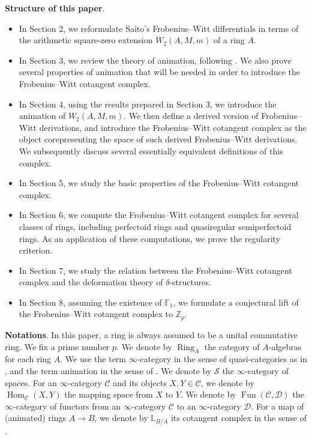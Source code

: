 \documentclass[11pt, a4paper]{amsart}
\theoremstyle{plain}
\theoremstyle{definition}
\begin{document}
\vspace{2mm}
\textbf{Structure of this paper}. 
\begin{itemize}
    \item In Section 2, we reformulate Saito’s Frobenius--Witt differentials in terms of the arithmetic square-zero extension $W_2(A,M,m)$ of a ring $A$.
    \item In Section 3, we review the theory of animation, following \cite{CS24}. We also prove several properties of animation that will be needed in order to introduce the Frobenius--Witt cotangent complex.
    \item In Section 4, using the results prepared in Section 3, we introduce the animation of $W_2(A,M,m)$. We then define a derived version of Frobenius--Witt derivations, and introduce the Frobenius--Witt cotangent complex as the object corepresenting the space of such derived Frobenius--Witt derivations. We subsequently discuss several essentially equivalent definitions of this complex.
    \item In Section 5, we study the basic properties of the Frobenius--Witt cotangent complex.
    \item In Section 6, we compute the Frobenius--Witt cotangent complex for several classes of rings, including perfectoid rings and quasiregular semiperfectoid rings. As an application of these computations, we prove the regularity criterion.
    \item In Section 7, we study the relation between the Frobenius--Witt cotangent complex and the deformation theory of $\delta$-structures.
    \item In Section 8, assuming the existence of $\mathbb F_1$, we formulate a conjectural lift of the Frobenius--Witt cotangent complex to $\mathbb Z_p$.
\end{itemize}















\vspace{2mm}
\textbf{Notations}. In this paper, a ring is always assumed to be a unital commutative ring. We fix a prime number $p$. We denote by $\operatorname{Ring}_A$ the category of $A$-algebras for each ring $A$. We use the term $\infty$-category in the sense of quasi-categories as in \cite{Lur09}, and the term animation in the sense of \cite[Section 5.1]{CS24}. We denote by $\mathcal S$ the $\infty$-category of spaces. For an $\infty$-category $\mathscr C$ and its objects $X, Y\in \mathscr C$, we denote by $\operatorname{Hom}_{\mathscr C}(X,Y)$ the mapping space from $X$ to $Y$. We denote by $\operatorname{Fun}(\mathscr C,\mathscr D)$ the $\infty$-category of functors from an $\infty$-category $\mathscr C$ to an $\infty$-category $\mathscr D$. For a map of (animated) rings $A\to B$, we denote by $\mathbb L_{B/A}$ its cotangent complex in the sense of \cite[Definition 2.33]{Mao24}.
\end{document}
